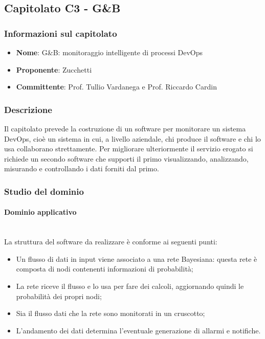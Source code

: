 \subsection{Capitolato C3 - G\&B}
\subsubsection{Informazioni sul capitolato}
\begin{itemize}
	\item \textbf{Nome}: G\&B: monitoraggio intelligente di processi DevOps
	\item \textbf{Proponente}: Zucchetti
	\item \textbf{Committente}: Prof. Tullio Vardanega e Prof. Riccardo Cardin
\end{itemize}
\subsubsection{Descrizione}
Il capitolato prevede la costruzione di un software per monitorare un sistema DevOps, cioè un sistema in cui, a livello aziendale, chi produce il software e chi lo usa collaborano strettamente. Per migliorare ulteriormente il servizio erogato si richiede un secondo software che supporti il primo visualizzando, analizzando, misurando e controllando i dati forniti dal primo.
\subsubsection{Studio del dominio}
\paragraph{Dominio applicativo} \mbox{}\\
La struttura del software da realizzare è conforme ai seguenti punti: 
\begin{itemize}
	\item Un flusso di dati in input viene associato a una rete Bayesiana: questa rete è composta di nodi contenenti informazioni di probabilità;
	\item La rete riceve il flusso e lo usa per fare dei calcoli, aggiornando quindi le probabilità dei propri nodi;
	\item Sia il flusso dati che la rete sono monitorati in un cruscotto;
	\item L'andamento dei dati determina l'eventuale generazione di allarmi e notifiche.
\end{itemize}
